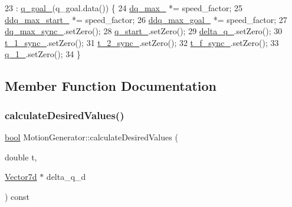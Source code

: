 \begin{DoxyCode}
23     : \hyperlink{classMotionGenerator_a181e3ac9ca9d23a813e06a69e4583ec7}{q\_goal\_}(q\_goal.data()) \{
24   \hyperlink{classMotionGenerator_af7cb3714dc8d242ac0a827838c4a977d}{dq\_max\_} *= speed\_factor;
25   \hyperlink{classMotionGenerator_aba35338c7023ab218a3c2991a36a79d4}{ddq\_max\_start\_} *= speed\_factor;
26   \hyperlink{classMotionGenerator_afa25b16e5c66c9f23c9869fa992b0bd4}{ddq\_max\_goal\_} *= speed\_factor;
27   \hyperlink{classMotionGenerator_a4924578b9275d362c015b16f80232263}{dq\_max\_sync\_}.setZero();
28   \hyperlink{classMotionGenerator_a11a7cfc3fa6c19202c7dcc2f5282046e}{q\_start\_}.setZero();
29   \hyperlink{classMotionGenerator_a943798bdc9c985f66548c59d562fd8b7}{delta\_q\_}.setZero();
30   \hyperlink{classMotionGenerator_a0b580a9e6904d925146081c870f76266}{t\_1\_sync\_}.setZero();
31   \hyperlink{classMotionGenerator_a5b25974dfd22aefacc286a01211ff93d}{t\_2\_sync\_}.setZero();
32   \hyperlink{classMotionGenerator_a7119bd48c0d8b0f838a3a81e8f52a8b2}{t\_f\_sync\_}.setZero();
33   \hyperlink{classMotionGenerator_a9e8620af632e541116e9b5e219f1ccbd}{q\_1\_}.setZero();
34 \}
\end{DoxyCode}


\subsection{Member Function Documentation}
\mbox{\label{classMotionGenerator_a7d436455ec33c3cbe8427b6d8611c83f}} 
\subsubsection{\texorpdfstring{calculate\+Desired\+Values()}{calculateDesiredValues()}}
{\footnotesize\ttfamily \hyperlink{classbool}{bool} Motion\+Generator\+::calculate\+Desired\+Values (\begin{DoxyParamCaption}\item[{double}]{t,  }\item[{\hyperlink{classMotionGenerator_a499bd17d3a5c7583b4c06923f532185d}{Vector7d} $\ast$}]{delta\+\_\+q\+\_\+d }\end{DoxyParamCaption}) const\hspace{0.3cm}{\ttfamily [private]}}



